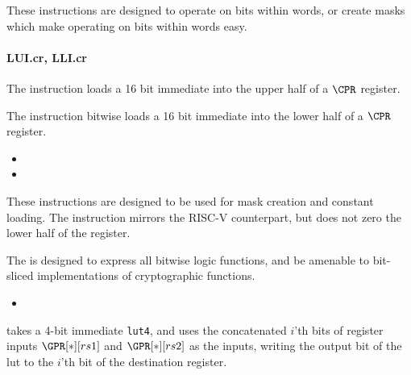 These instructions are designed to operate on bits within words, or
create masks which make operating on bits within words easy.

\paragraph{LUI.cr, LLI.cr}

The  instruction loads a 16 bit immediate into the
upper half of a $\CPR$ register.

The  instruction bitwise loads a 16 bit immediate into the
lower half of a $\CPR$ register. 

\begin{itemize}
\item {}
\item {}
\end{itemize}

These instructions are designed to be used for mask creation and constant
loading. The  instruction mirrors the RISC-V counterpart, but
does not zero the lower half of the register.



The  is designed to express all bitwise logic functions, and be
amenable to bit-sliced implementations of cryptographic functions.

\begin{itemize}
\item {}
\end{itemize}

 takes a 4-bit immediate {\tt lut4}, and uses the concatenated
$i$'th bits of register inputs $\GPR[*][rs1]$ and  $\GPR[*][rs2]$
as the inputs, writing the output bit of the lut to the $i$'th bit of the
destination register.

